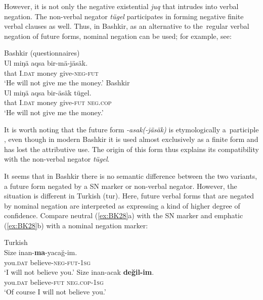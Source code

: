 \documentclass[output=paper,draft,draftmode,colorlinks,citecolor=brown]{langscibook}
\begin{document}
However, it is not only the negative existential \textit{juq} that intrudes into verbal negation. The non-verbal negator \textit{tügel} participates in forming negative finite verbal clauses as well. Thus, in Bashkir, as an alternative to the regular verbal negation of future forms, nominal negation can be used; for example, see:

\ea \label{ex:BK27}
  \ea Bashkir (questionnaires)\\
	\gll Ul		miŋä		aqsa		bir-mä-jäsäk.\\
	that	I.\textsc{dat}		money	give-\textsc{neg-fut}\\
	\glt `He will not give me the money.'
  \ex Bashkir \citep[349]{say2017a}\\
	\gll Ul		miŋä		aqsa		bir-äsäk		tügel.\\
	that	I.\textsc{dat}		money	give-\textsc{fut}	\textsc{neg.cop}\\
	\glt `He will not give me the money.'
\z \z

It is worth noting that the future form \textit{-asak(-jäsäk)} is etymologically a participle \citep[152]{dmitriev1948a}, even though in modern Bashkir it is used almost exclusively as a finite form and has lost the attributive use. The origin of this form thus explains its compatibility with the non-verbal negator \textit{tügel}.

It seems that in Bashkir there is no semantic difference between the two variants, a future form negated by a SN marker or non-verbal negator. However, the situation is different in Turkish (tur). Here, future verbal forms that are negated by nominal negation are interpreted as expressing a kind of higher degree of confidence. Compare neutral (\ref{ex:BK28}a) with the SN marker and emphatic (\ref{ex:BK28}b) with a nominal negation marker:

\ea Turkish \citep[244]{ketrez2012a} \label{ex:BK28}\\
  \ea
	\gll Size		inan-\textbf{ma}-yacağ-im.\\
	you.\textsc{dat}	believe-\textsc{neg-fut-1sg}\\
	\glt `I will not believe you.'
  \ex
	\gll Size		inan-acak		\textbf{değil-im}.\\
	you.\textsc{dat}	believe-\textsc{fut}		\textsc{neg.cop-1sg}\\
	\glt `Of course I will not believe you.'
\z \z
\end{document}
